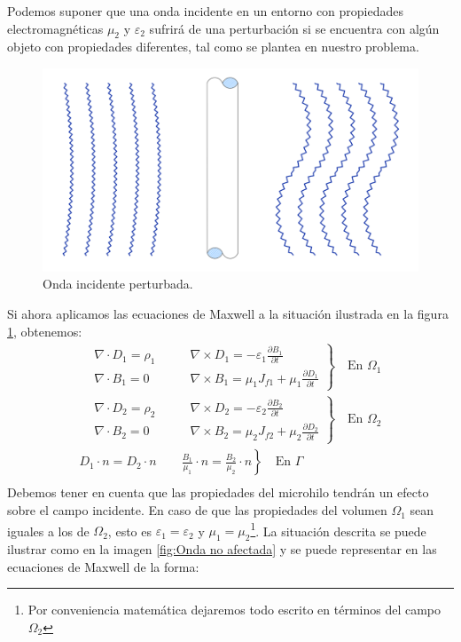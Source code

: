 \documentclass[11pt]{article}
\begin{document}
\newpage
Podemos suponer que una onda incidente en un entorno con propiedades electromagnéticas $\mu_2$ y $\varepsilon_2$ sufrirá de una perturbación si se encuentra con algún objeto con propiedades diferentes, tal como se plantea en nuestro problema.
\begin{figure}[H]
\centering
\includegraphics[width=16cm]{Imagenes/ondaincidente3.png}
\caption{Onda incidente perturbada.}\label{fig:Onda perturbada}
\end{figure}
Si ahora aplicamos las ecuaciones de Maxwell a la situación ilustrada en la figura \ref{fig:Onda perturbada}, obtenemos:
\begin{equation}
\label{eq:Onda perturbada}
\begin{split}
\left.
\begin{aligned}
&\nabla\cdot D_1 = \rho_1\qquad & \nabla\times D_1 = -\varepsilon_1\frac{\partial B_1}{\partial t}\\
&\nabla\cdot B_1 = 0\qquad & \nabla\times B_1 = \mu_1 J_{f1}+\mu_1\frac{\partial D_1}{\partial t}
\end{aligned}
\right\}
\quad\text{En }\Omega_1\\
\left.
\begin{aligned}
&\nabla\cdot D_2 = \rho_2\qquad & \nabla\times D_2 = -\varepsilon_2\frac{\partial B_2}{\partial t}\\
&\nabla\cdot B_2 = 0\qquad & \nabla\times B_2 = \mu_2 J_{f2}+\mu_2\frac{\partial D_2}{\partial t}
\end{aligned}
\right\}
\quad\text{En }\Omega_2\\
\left. 
D_1\cdot n=D_2\cdot n \qquad \frac{B_1}{\mu_1}\cdot n=\frac{B_2}{\mu_2}\cdot n
\right\}
\quad\text{En }\Gamma\\
\end{split}
\end{equation}
Debemos tener en cuenta que las propiedades del microhilo tendrán un efecto sobre el campo incidente. En caso de que las propiedades del volumen $\Omega_1$ sean iguales a los de $\Omega_2$, esto es $\varepsilon_1=\varepsilon_2$ y $\mu_1=\mu_2$\footnote{Por conveniencia matemática dejaremos todo escrito en términos del campo $\Omega_2$}. La situación descrita se puede ilustrar como en la imagen \ref{fig:Onda no afectada} y se puede representar en las ecuaciones de Maxwell de la forma:
\end{document}
